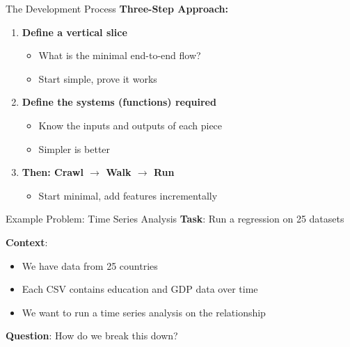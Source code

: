 \documentclass[aspectratio=169]{beamer}
\begin{document}
\begin{frame}{The Development Process}
\textbf{Three-Step Approach:}
\begin{enumerate}
    \item \textbf{Define a vertical slice}
    \begin{itemize}
        \item What is the minimal end-to-end flow?
        \item Start simple, prove it works
    \end{itemize}
    \vspace{0.2cm}
    \item \textbf{Define the systems (functions) required}
    \begin{itemize}
        \item Know the inputs and outputs of each piece
        \item Simpler is better
    \end{itemize}
    \vspace{0.2cm}
    \item \textbf{Then: Crawl $\rightarrow$ Walk $\rightarrow$ Run}
    \begin{itemize}
        \item Start minimal, add features incrementally
    \end{itemize}
\end{enumerate}
\end{frame}

\begin{frame}{Example Problem: Time Series Analysis}
\textbf{Task}: Run a regression on 25 datasets
\vspace{0.3cm}

\textbf{Context}:
\begin{itemize}
    \item We have data from 25 countries
    \item Each CSV contains education and GDP data over time
    \item We want to run a time series analysis on the relationship
\end{itemize}
\vspace{0.3cm}

\textbf{Question}: How do we break this down?
\end{frame}
\end{document}
